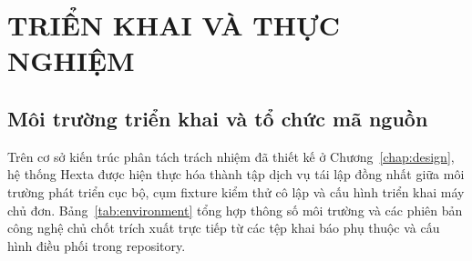 \chapter{TRIỂN KHAI VÀ THỰC NGHIỆM}\label{chap:evaluation}

\section{Môi trường triển khai và tổ chức mã nguồn}
Trên cơ sở kiến trúc phân tách trách nhiệm đã thiết kế ở Chương~\ref{chap:design}, hệ thống Hexta được hiện thực hóa thành tập dịch vụ tái lập đồng nhất giữa môi trường phát
triển cục bộ, cụm fixture kiểm thử cô lập và cấu hình triển khai máy chủ đơn. Bảng~\ref{tab:environment} tổng hợp thông số môi trường và các phiên bản công nghệ chủ chốt trích
xuất trực tiếp từ các tệp khai báo phụ thuộc và cấu hình điều phối trong repository.


